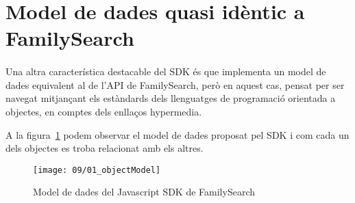 \section{Model de dades quasi idèntic a FamilySearch}

    \paragraph{}
    Una altra característica destacable del SDK és que implementa un model de dades equivalent al de l’API de FamilySearch, però en aquest cas, pensat per ser navegat mitjançant els estàndards dels llenguatges de programació orientada a objectes, en comptes dels enllaços hypermedia.

    A la figura~\ref{fig:sdkDataModel} podem observar el model de dades proposat pel SDK i com cada un dels objectes es troba relacionat amb els altres.

    \begin{figure}[h]
        \texttt{[image: 09/01\_objectModel]}
        \centering
        \caption{Model de dades del Javascript SDK de FamilySearch}\label{fig:sdkDataModel}
    \end{figure}
